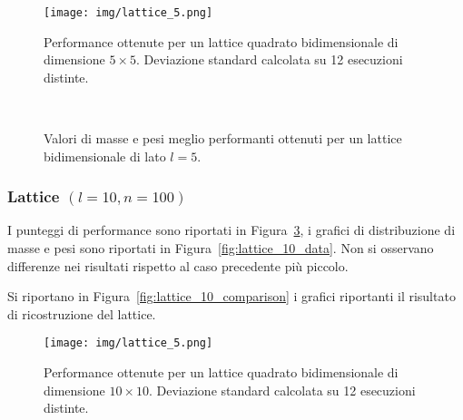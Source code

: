 \documentclass[10pt,a4paper]{article}
\begin{document}
\begin{figure}[p]
    \centering
    \texttt{[image: img/lattice\_5.png]}
    \caption{Performance ottenute per un lattice quadrato bidimensionale di dimensione \(5 \times 5\). Deviazione standard calcolata su 12 esecuzioni distinte.}\label{fig:lattice_5_performance}
\end{figure}

\begin{figure}[p]
    \centering
    \\
    \caption{Valori di masse e pesi meglio performanti ottenuti per un lattice bidimensionale di lato \(l=5\).}\label{fig:lattice_5_data}
\end{figure}

\subsubsection{Lattice \((l = 10, n = 100)\)}

I punteggi di performance sono riportati in Figura~\ref{fig:lattice_10_performance}, i grafici di distribuzione di masse e pesi sono riportati in Figura~\ref{fig:lattice_10_data}.
Non si osservano differenze nei risultati rispetto al caso precedente più piccolo.

Si riportano in Figura~\ref{fig:lattice_10_comparison} i grafici riportanti il risultato di ricostruzione del lattice.

\begin{figure}[p]
    \centering
    \texttt{[image: img/lattice\_5.png]}
    \caption{Performance ottenute per un lattice quadrato bidimensionale di dimensione \(10 \times 10\). Deviazione standard calcolata su 12 esecuzioni distinte.}\label{fig:lattice_10_performance}
\end{figure}
\end{document}
